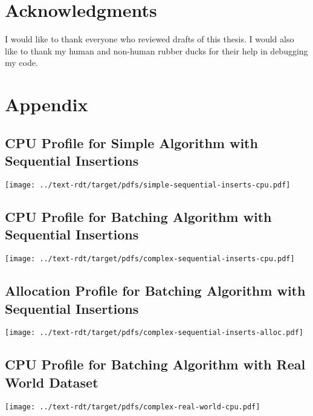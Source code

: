 \documentclass[
	english,
	ruledheaders=section,
	class=report,
	thesis={type=bachelor},
	accentcolor=9c,
	custommargins=true,
	marginpar=false,
	parskip=half-,
	fontsize=11pt,
    listof=totoc
]{tudapub}
\begin{document}








\chapter*{Acknowledgments}
I would like to thank everyone who reviewed drafts of this thesis. I would also like to thank my human and non-human rubber ducks for their help in debugging my code.

\printglossary[type=\acronymtype]

\printbibliography

\appendix

\chapter{Appendix}
\label{appendix:appendix}
\section{CPU Profile for Simple Algorithm with Sequential Insertions}
\label{appendix:simple-sequential-inserts-cpu}
\texttt{[image: ../text-rdt/target/pdfs/simple-sequential-inserts-cpu.pdf]}
\section{CPU Profile for Batching Algorithm with Sequential Insertions}
\label{appendix:complex-sequential-inserts-cpu}
\texttt{[image: ../text-rdt/target/pdfs/complex-sequential-inserts-cpu.pdf]}
\section{Allocation Profile for Batching Algorithm with Sequential Insertions}
\label{appendix:complex-sequential-inserts-alloc}
\texttt{[image: ../text-rdt/target/pdfs/complex-sequential-inserts-alloc.pdf]}
\section{CPU Profile for Batching Algorithm with Real World Dataset}
\label{appendix:complex-real-world-cpu}
\texttt{[image: ../text-rdt/target/pdfs/complex-real-world-cpu.pdf]}
\end{document}
